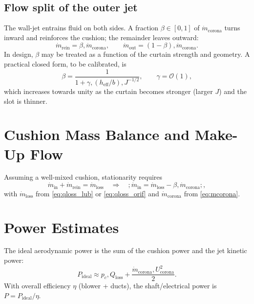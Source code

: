 \documentclass[11pt,a4paper]{article}
\begin{document}
\subsection*{Flow split of the outer jet}
The wall-jet entrains fluid on both sides. A fraction $\beta\in[0,1]$ of $\dot m_{\mathrm{corona}}$ turns inward and reinforces the cushion; the remainder leaves outward:
\begin{equation}
\dot m_{\mathrm{rein}}=\beta,\dot m_{\mathrm{corona}},\qquad \dot m_{\mathrm{out}}=(1-\beta),\dot m_{\mathrm{corona}}.
\label{eq:split}
\end{equation}
In design, $\beta$ may be treated as a function of the curtain strength and geometry. A practical closed form, to be calibrated, is
\begin{equation}
\beta = \frac{1}{1+\gamma,(h_{\mathrm{eff}}/b),J^{-1/2}},\qquad \gamma=\mathcal{O}(1),
\label{eq:beta}
\end{equation}
which increases towards unity as the curtain becomes stronger (larger $J$) and the slot is thinner.

\section{Cushion Mass Balance and Make-Up Flow}
Assuming a well-mixed cushion, stationarity requires
\begin{equation}
\dot m_{\mathrm{in}} + \dot m_{\mathrm{rein}} = \dot m_{\mathrm{loss}} \quad \Rightarrow \quad \boxed{;\dot m_{\mathrm{in}} = \dot m_{\mathrm{loss}} - \beta,\dot m_{\mathrm{corona}};},
\label{eq:massbalance}
\end{equation}
with $\dot m_{\mathrm{loss}}$ from \eqref{eq:qloss_lub} or \eqref{eq:qloss_orif} and $\dot m_{\mathrm{corona}}$ from \eqref{eq:mcorona}.

\section{Power Estimates}
The ideal aerodynamic power is the sum of the cushion power and the jet kinetic power:
\begin{equation}
P_{\mathrm{ideal}} \approx p_c,Q_{\mathrm{loss}} + \frac{\dot m_{\mathrm{corona}},U_{\mathrm{corona}}^{2}}{2}.
\label{eq:power}
\end{equation}
With overall efficiency $\eta$ (blower + ducts), the shaft/electrical power is $P=P_{\mathrm{ideal}}/\eta$.
\end{document}
